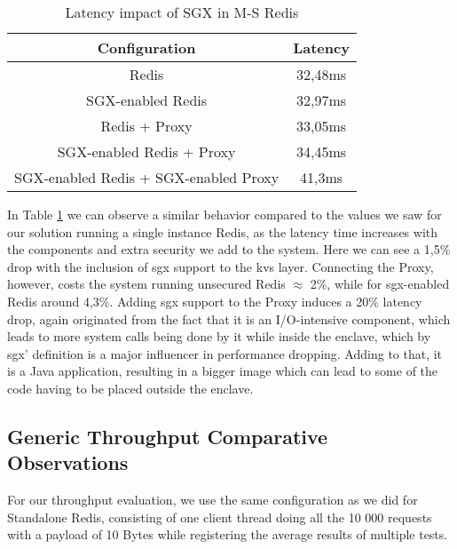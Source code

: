 \begin{table}[ht]
	\caption{Latency impact of SGX in M-S Redis} %
	\centering %
	\begin{tabular}{c c} %
		\hline\hline %
		\textbf{Configuration} & \textbf{Latency} \\ [0.5ex] %
		\hline
		Redis & 32,48ms\\
		\hline
		SGX-enabled Redis & 32,97ms \\
		\hline
		Redis + Proxy & 33,05ms \\
		\hline
		SGX-enabled Redis + Proxy & 34,45ms \\
		\hline %
		SGX-enabled Redis + SGX-enabled Proxy & 41,3ms\\ [1ex] %
		\hline %
	\end{tabular}
	\label{table:latencyMasterSlaveRedis} %
\end{table}
\vspace{5mm}

In Table \ref{table:latencyMasterSlaveRedis} we can observe a similar behavior compared to the values we saw for our solution running a single instance Redis, as the latency time increases with the components and extra security we add to the system. Here we can see a 1,5\% drop with the inclusion of \gls{sgx} support to the \gls{kvs} layer. Connecting the Proxy, however, costs the system running unsecured Redis $\approx$ 2\%, while for \gls{sgx}-enabled Redis around 4,3\%. Adding \gls{sgx} support to the Proxy induces a 20\% latency drop, again originated from the fact that it is an I/O-intensive component, which leads to more system calls being done by it while inside the enclave, which by \gls{sgx}' definition is a major influencer in performance dropping. Adding to that, it is a Java application, resulting in a bigger image which can lead to some of the code having to be placed outside the enclave.

\subsection{Generic Throughput Comparative Observations}
For our throughput evaluation, we use the same configuration as we did for Standalone Redis, consisting of one client thread doing all the 10 000 requests with a payload of 10 Bytes while registering the average results of multiple tests.


